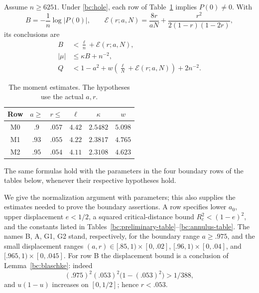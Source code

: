 \begin{proposition}\label{bc:moment-proposition}
Assume $n\geq6251$.  Under \eqref{bc:hole}, each row of
Table~\ref{bc:moment-conclusions} implies $P(0)\ne0$.  With
\begin{equation}\label{bc:B-and-error}
 B=-\frac1n\log|P(0)|,\qquad
 \mathcal E(r;a,N)=\frac{8r}{aN}
       +\frac{r^2}{2(1-r)(1-2r)},
\end{equation}
its conclusions are
\begin{align}
 B&<\frac\ell n+\mathcal E(r;a,N),                 \label{bc:moment-B}\\
 |\mu|&\leq\kappa B+n^{-2},                       \label{bc:moment-mean}\\
 Q&<1-a^2+w\left(\frac\ell N+\mathcal E(r;a,N)\right)
                   +2n^{-2}.                    \label{bc:moment-Q}
\end{align}
\begin{table}[ht]
\centering
\caption{The moment estimates.  The hypotheses use the actual $a,r$.}
\label{bc:moment-conclusions}
\begin{tabular}{@{}cccccc@{}}\toprule
Row&$a\geq$&$r\leq$&$\ell$&$\kappa$&$w$\\\midrule
M0&$.9$&$.057$&$4.42$&$2.5482$&$5.098$\\
M1&$.93$&$.055$&$4.22$&$2.3817$&$4.765$\\
M2&$.95$&$.054$&$4.11$&$2.3108$&$4.623$\\\bottomrule
\end{tabular}
\end{table}
The same formulas hold with the parameters in the four boundary rows
of the tables below, whenever their respective hypotheses hold.
\end{proposition}

We give the normalization argument with parameters; this also supplies
the estimates needed to prove the boundary assertions.  A row specifies
lower $a_0$, upper displacement $e<1/2$, a squared critical-distance
bound $R_c^2<(1-e)^2$, and the constants listed in
Tables~\ref{bc:preliminary-table}--\ref{bc:annulus-table}.
The names B, A, G1, G2 stand, respectively, for the boundary range
$a\geq.975$, and the small displacement ranges
$(a,r)\in[.85,1)\times[0,.02]$,
$[.96,1)\times[0,.04]$, and
$[.965,1)\times[0,.045]$.
For row B the displacement bound is a conclusion of
Lemma~\ref{bc:blaschke}: indeed
\[
 (.975)^2(.053)^2\bigl(1-(.053)^2\bigr)>1/388,
\]
and $u(1-u)$ increases on $[0,1/2]$; hence $r<.053$.

